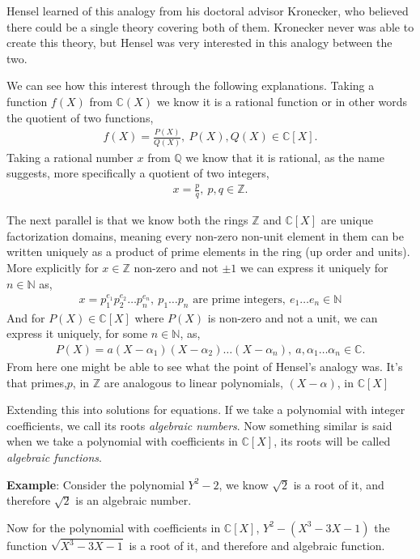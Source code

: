 \documentclass[12pt]{article}
\newcommand{\zz}{\mathbb Z}   %
\newcommand{\qq}{\mathbb Q}   %
\newcommand{\nn}{\mathbb N}   %
\newcommand{\cc}{\mathbb C}   %
\begin{document}
Hensel learned of this analogy from his doctoral advisor Kronecker, who believed there could be a single theory covering both of them. Kronecker never was able to create this theory, but Hensel was very interested in this analogy between the two. 

We can see how this interest through the following explanations. Taking a function $f(X)$ from $\cc(X)$ we know it is a rational function or in other words the quotient of two functions,
\begin{align*}
  f(X) = \frac{P(X)}{Q(X)}, \ P(X),Q(X) \in \cc[X].
\end{align*}
Taking a rational number $x$ from $\qq$ we know that it is rational, as the name suggests, more specifically a quotient of two integers,
\begin{align*}
  x = \frac{p}{q}, \ p,q \in \zz.
\end{align*}

The next parallel is that we know both the rings $\zz$ and $\cc[X]$ are unique factorization domains, meaning every non-zero non-unit element in them can be written uniquely as a product of prime elements in the ring (up order and units). More explicitly for $x \in \zz$ non-zero and not $\pm 1$ we can express it uniquely for $n \in \nn$ as,
\begin{align*}
  x = p_1^{e_1} p_2^{e_2}\dots p_n^{e_n}, \ p_1\dots p_n \text{  are prime integers}, \ e_1\dots e_n \in \nn
\end{align*}
And for $P(X) \in \cc[X]$ where $P(X)$ is non-zero and not a unit, we can express it uniquely, for some $n \in \nn$, as,
\begin{align*}
  P(X) = a(X - \alpha_1)(X-\alpha_2)\dots (X - \alpha_n), \ a,\alpha_1\dots\alpha_n \in \cc.
\end{align*}
From here one might be able to see what the point of Hensel's analogy was. It's that primes,$p$, in $\zz$ are analogous to linear polynomials, $(X-\alpha)$, in $\cc[X]$

Extending this into solutions for equations. If we take a polynomial with integer coefficients, we call its roots \textit{algebraic numbers}. Now something similar is said when we take a polynomial with coefficients in $\cc[X]$, its roots will be called \textit{algebraic functions}.

\textbf{Example}: Consider the polynomial $Y^{2}-2$, we know $\sqrt{2}$ is a root of it, and therefore $\sqrt{2}$ is an algebraic number. 

Now for the polynomial with coefficients in $\cc[X]$, $Y^{2} - (X^{3}-3X - 1)$ the function $\sqrt{X^{3}-3X -1}$ is a root of it, and therefore and algebraic function. 
\end{document}

